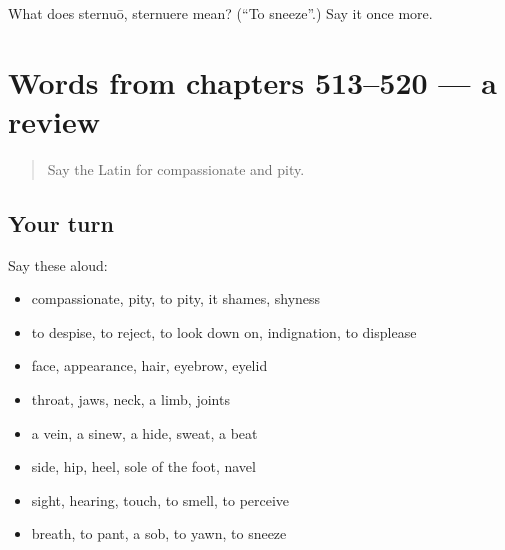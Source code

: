 \begin{tcolorbox}[breakable,colback=teal!4,colframe=teal!35!black,title={Before you move on}]
What does sternuō, sternuere mean? (\textquotedblleft{}To sneeze\textquotedblright{}.) Say it once more.
\end{tcolorbox}
\section[(dialogue)]{Words from chapters 513–520 — a review}

\label{lesson:LA-R520-review-513-520}



\begin{quote}
Say the Latin for compassionate and pity.
\end{quote}

\subsection*{Your turn}
Say these aloud:

\begin{itemize}
\raggedright
  \item compassionate, pity, to pity, it shames, shyness
  \item to despise, to reject, to look down on, indignation, to displease
  \item face, appearance, hair, eyebrow, eyelid
  \item throat, jaws, neck, a limb, joints
  \item a vein, a sinew, a hide, sweat, a beat
  \item side, hip, heel, sole of the foot, navel
  \item sight, hearing, touch, to smell, to perceive
  \item breath, to pant, a sob, to yawn, to sneeze
\end{itemize}

